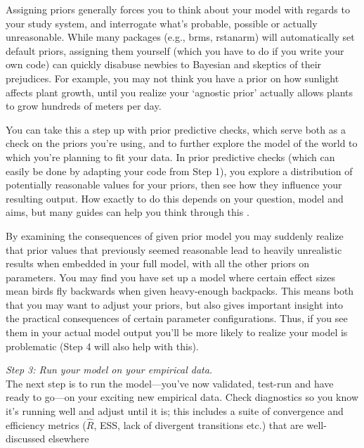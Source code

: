 \documentclass[11pt]{article}
\begin{document}
{Assigning priors generally forces you to think about your model with regards to your study system, and interrogate what's probable, possible or actually unreasonable. While many packages (e.g., \textsf{brms, rstanarm}) will automatically set default priors, assigning them yourself (which you have to do if you write your own code) can quickly disabuse newbies to Bayesian and skeptics of their prejudices. For example, you may not think you have a prior on how sunlight affects plant growth, until you realize your `agnostic prior' actually allows plants to grow hundreds of meters per day. %

You can take this a step up with prior predictive checks, which serve both as a check on the priors you're using, and to further explore the model of the world to which you're planning to fit your data. In prior predictive checks (which can easily be done by adapting your code from Step 1), you explore a distribution of potentially reasonable values for your priors, then see how they influence your resulting output. How exactly to do this depends on your question, model and aims, but many guides can help you think through this \citep{betanprior,wesner2021,winter2023}. 

By examining the consequences of given prior model you may suddenly realize that prior values that previously seemed reasonable lead to heavily unrealistic results when embedded in your full model, with all the other priors on parameters. You may find you have set up a model where certain effect sizes mean birds fly backwards when given heavy-enough backpacks. This means both that you may want to adjust your priors, but also gives important insight into the practical
consequences of certain parameter configurations. Thus, if you see them in your actual model output you'll be more likely to realize your model is problematic (Step 4 will also help with this).

 \emph{Step 3: Run your model on your empirical data.} \\
The next step is to run the model---you've now validated, test-run and have ready to go---on your exciting new empirical data. Check diagnostics so you know it's running well and adjust until it is; this includes a suite of convergence and efficiency metrics ($\hat{R}$, ESS, lack of divergent transitions etc.) that are well-discussed elsewhere \citep[and not our focus here, see instead][]{betanworkflow,gelman2020bayesian,vandeschoot2021,gabryvis}
 
}
\end{document}

